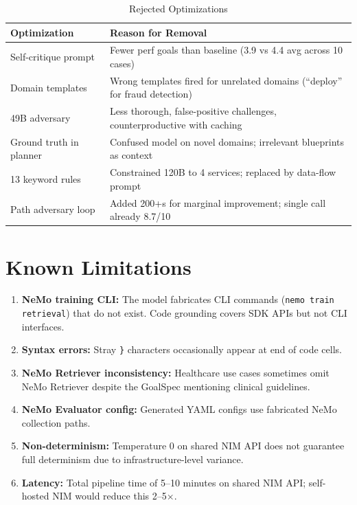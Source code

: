 \documentclass[conference]{IEEEtran}
\begin{document}
\begin{table}[h]
\centering
\caption{Rejected Optimizations}
\label{tab:rejected}
\begin{tabular}{@{}L{2.5cm}L{5cm}@{}}
\toprule
\textbf{Optimization} & \textbf{Reason for Removal} \\
\midrule
Self-critique prompt & Fewer perf goals than baseline (3.9 vs 4.4 avg across 10 cases) \\
Domain templates & Wrong templates fired for unrelated domains (``deploy'' for fraud detection) \\
49B adversary & Less thorough, false-positive challenges, counterproductive with caching \\
Ground truth in planner & Confused model on novel domains; irrelevant blueprints as context \\
13 keyword rules & Constrained 120B to 4 services; replaced by data-flow prompt \\
Path adversary loop & Added 200+s for marginal improvement; single call already 8.7/10 \\
\bottomrule
\end{tabular}
\end{table}

\section{Known Limitations}

\begin{enumerate}
    \item \textbf{NeMo training CLI:} The model fabricates CLI commands (\texttt{nemo train retrieval}) that do not exist. Code grounding covers SDK APIs but not CLI interfaces.
    \item \textbf{Syntax errors:} Stray \texttt{\}} characters occasionally appear at end of code cells.
    \item \textbf{NeMo Retriever inconsistency:} Healthcare use cases sometimes omit NeMo Retriever despite the GoalSpec mentioning clinical guidelines.
    \item \textbf{NeMo Evaluator config:} Generated YAML configs use fabricated NeMo collection paths.
    \item \textbf{Non-determinism:} Temperature 0 on shared NIM API does not guarantee full determinism due to infrastructure-level variance.
    \item \textbf{Latency:} Total pipeline time of 5--10 minutes on shared NIM API; self-hosted NIM would reduce this 2--5$\times$.
\end{enumerate}
\end{document}
